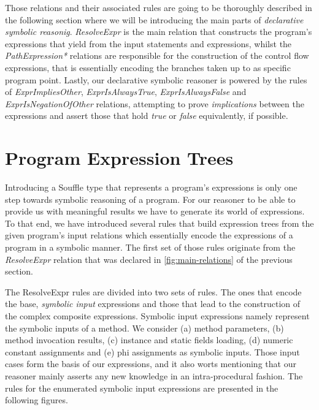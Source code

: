 Those relations and their associated rules are going to be thoroughly described in the
following section where we will be introducing the main parts of \emph{declarative symbolic reasonig}.
\emph{ResolveExpr} is the main relation that constructs the program's expressions that yield
from the input statements and expressions, whilst the \emph{PathExpression*} relations are responsible
for the construction of the control flow expressions, that is essentially encoding the
branches taken up to as specific program point. Lastly, our declarative symbolic reasoner
is powered by the rules of \emph{ExprImpliesOther}, \emph{ExprIsAlwaysTrue}, \emph{ExprIsAlwaysFalse}
and \emph{ExprIsNegationOfOther} relations, attempting to prove \emph{implications} between the expressions
and assert those that hold \emph{true} or \emph{false} equivalently, if possible.\\

\section{Program Expression Trees}


Introducing a Souffle type that represents a program's expressions is only one
step towards symbolic reasoning of a program. For our reasoner to be able to provide us
with meaningful results we have to generate its world of expressions. To that end, we
have introduced several rules that build expression trees from the given program's
input relations which essentially encode the expressions of a program in a symbolic
manner. The first set of those rules originate from the \emph{ResolveExpr} relation
that was declared in \ref{fig:main-relations} of the previous section.

The ResolveExpr rules are divided into two sets of rules. The ones that encode
the base, \emph{symbolic input} expressions and those that lead to the construction of the
complex composite expressions. Symbolic input expressions namely represent the
symbolic inputs of a method. We consider (a) method parameters, (b) method invocation
results, (c) instance and static fields loading, (d) numeric constant assignments and
(e) phi assignments as symbolic inputs. Those input cases form the basis of our
expressions, and it also worts mentioning that our reasoner mainly asserts any new
knowledge in an intra-procedural fashion. The rules for the enumerated symbolic
input expressions are presented in the following figures.\\

